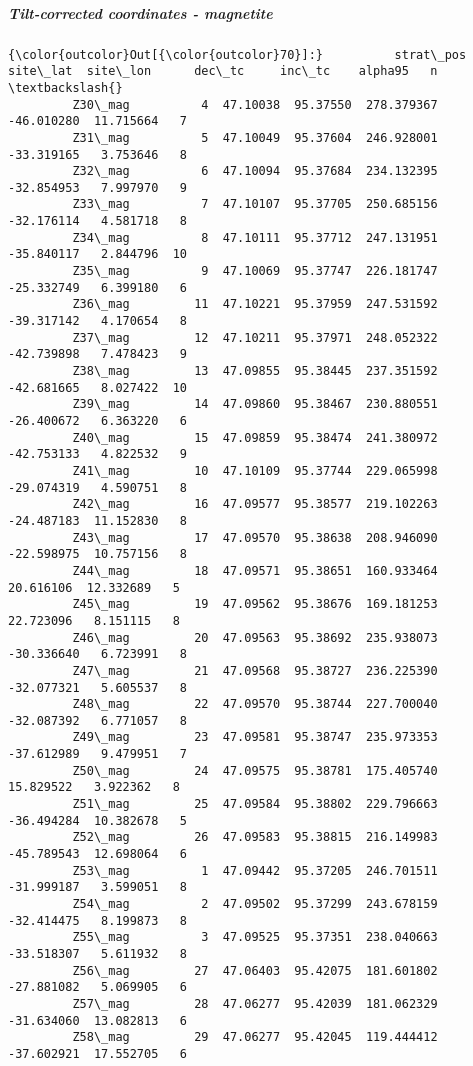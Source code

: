 \documentclass[11pt]{article}
\begin{document}
    \subparagraph{Tilt-corrected coordinates -
magnetite}\label{tilt-corrected-coordinates---magnetite}


            \begin{Verbatim}[commandchars=\\\{\}]
{\color{outcolor}Out[{\color{outcolor}70}]:}          strat\_pos  site\_lat  site\_lon      dec\_tc     inc\_tc    alpha95   n  \textbackslash{}
         Z30\_mag          4  47.10038  95.37550  278.379367 -46.010280  11.715664   7   
         Z31\_mag          5  47.10049  95.37604  246.928001 -33.319165   3.753646   8   
         Z32\_mag          6  47.10094  95.37684  234.132395 -32.854953   7.997970   9   
         Z33\_mag          7  47.10107  95.37705  250.685156 -32.176114   4.581718   8   
         Z34\_mag          8  47.10111  95.37712  247.131951 -35.840117   2.844796  10   
         Z35\_mag          9  47.10069  95.37747  226.181747 -25.332749   6.399180   6   
         Z36\_mag         11  47.10221  95.37959  247.531592 -39.317142   4.170654   8   
         Z37\_mag         12  47.10211  95.37971  248.052322 -42.739898   7.478423   9   
         Z38\_mag         13  47.09855  95.38445  237.351592 -42.681665   8.027422  10   
         Z39\_mag         14  47.09860  95.38467  230.880551 -26.400672   6.363220   6   
         Z40\_mag         15  47.09859  95.38474  241.380972 -42.753133   4.822532   9   
         Z41\_mag         10  47.10109  95.37744  229.065998 -29.074319   4.590751   8   
         Z42\_mag         16  47.09577  95.38577  219.102263 -24.487183  11.152830   8   
         Z43\_mag         17  47.09570  95.38638  208.946090 -22.598975  10.757156   8   
         Z44\_mag         18  47.09571  95.38651  160.933464  20.616106  12.332689   5   
         Z45\_mag         19  47.09562  95.38676  169.181253  22.723096   8.151115   8   
         Z46\_mag         20  47.09563  95.38692  235.938073 -30.336640   6.723991   8   
         Z47\_mag         21  47.09568  95.38727  236.225390 -32.077321   5.605537   8   
         Z48\_mag         22  47.09570  95.38744  227.700040 -32.087392   6.771057   8   
         Z49\_mag         23  47.09581  95.38747  235.973353 -37.612989   9.479951   7   
         Z50\_mag         24  47.09575  95.38781  175.405740  15.829522   3.922362   8   
         Z51\_mag         25  47.09584  95.38802  229.796663 -36.494284  10.382678   5   
         Z52\_mag         26  47.09583  95.38815  216.149983 -45.789543  12.698064   6   
         Z53\_mag          1  47.09442  95.37205  246.701511 -31.999187   3.599051   8   
         Z54\_mag          2  47.09502  95.37299  243.678159 -32.414475   8.199873   8   
         Z55\_mag          3  47.09525  95.37351  238.040663 -33.518307   5.611932   8   
         Z56\_mag         27  47.06403  95.42075  181.601802 -27.881082   5.069905   6   
         Z57\_mag         28  47.06277  95.42039  181.062329 -31.634060  13.082813   6   
         Z58\_mag         29  47.06277  95.42045  119.444412 -37.602921  17.552705   6   
         

\end{Verbatim}
\end{document}
